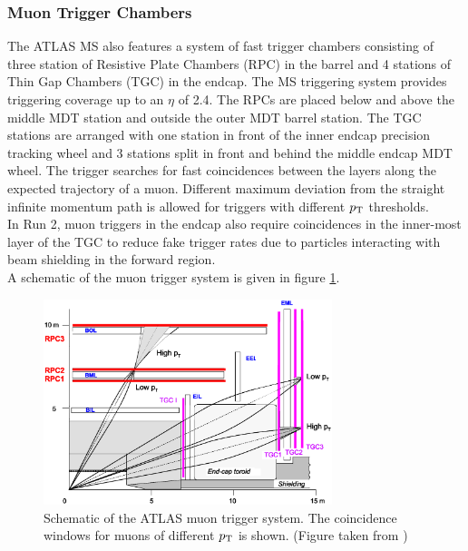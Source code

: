 \subsubsection*{Muon Trigger Chambers}

\indent  The ATLAS MS also features a system of fast trigger chambers consisting of three station of Resistive Plate Chambers (RPC) in the barrel and 4 stations of Thin Gap Chambers (TGC) in the endcap.  The MS triggering system provides triggering coverage up to an $\eta$ of 2.4.  The RPCs are placed below and above the middle MDT station and outside the outer MDT barrel station.  The TGC stations are arranged with one station in front of the inner endcap precision tracking wheel and 3 stations split in front and behind the middle endcap MDT wheel.  The trigger searches for fast coincidences between the layers along the expected trajectory of a muon.  Different maximum deviation from the straight infinite momentum path is allowed for triggers with different $p_{\mathrm{T}}$ thresholds. \\

\indent In Run 2, muon triggers in the endcap also require coincidences in the inner-most layer of the TGC to reduce fake trigger rates due to particles interacting with beam shielding in the forward region. \\

\indent A schematic of the muon trigger system is given in figure \ref{LHC:fig:MS_trigger}. \\

\begin{figure}[h!]
\centering
\includegraphics[width=0.75\textwidth, angle=0]{figures/LHC_ATLAS/RPC_TGC_schematics_5.eps}
\caption[Schematic of the ATLAS muon trigger system]{ Schematic of the ATLAS muon trigger system.  The coincidence windows for muons of different $p_{\mathrm{T}}$ is shown. (Figure taken from \cite{ATLAS_JINST}) \label{LHC:fig:MS_trigger}}
\end{figure}
